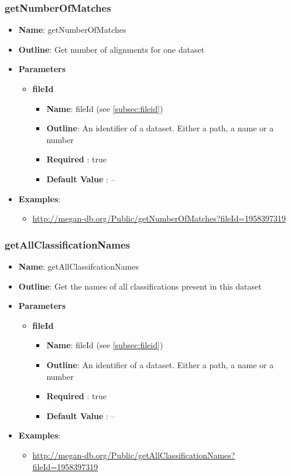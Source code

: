 \documentclass[11pt]{article}
\begin{document}
\subsubsection{getNumberOfMatches}

\begin{itemize}
	\item \textbf{Name}: getNumberOfMatches
	\item \textbf{Outline}: Get number of alignments for one dataset
	\item \textbf{Parameters}
		\begin{itemize}
			\item \textbf{fileId}
				\begin{itemize}
					\item \textbf{Name}: fileId (see \ref{subsec:fileid})
					\item \textbf{Outline}: An identifier of a dataset. Either a path, a name or a number
					\item \textbf{Required} : true
					\item \textbf{Default Value} : --
				\end{itemize}
		\end{itemize}
	\item \textbf{Examples}:
		\begin{itemize}
			\item \url{http://megan-db.org/Public/getNumberOfMatches?fileId=1958397319}
		\end{itemize}
\end{itemize}


\subsubsection{getAllClassificationNames}
\begin{itemize}
	\item \textbf{Name}: getAllClassifcationNames
	\item \textbf{Outline}: Get the names of all classifications present in this dataset
	\item \textbf{Parameters}
		\begin{itemize}
			\item \textbf{fileId}
				\begin{itemize}
					\item \textbf{Name}: fileId (see \ref{subsec:fileid})
					\item \textbf{Outline}: An identifier of a dataset. Either a path, a name or a number
					\item \textbf{Required} : true
					\item \textbf{Default Value} : --
				\end{itemize}
		\end{itemize}
	\item \textbf{Examples}:
		\begin{itemize}
			\item \url{http://megan-db.org/Public/getAllClassificationNames?fileId=1958397319}
		\end{itemize}
\end{itemize}
\end{document}
